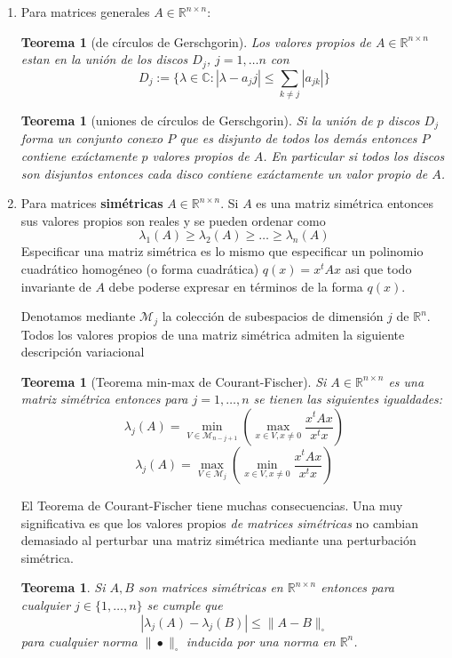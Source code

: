 \documentclass[12pt]{amsart}
\newtheorem{theorem}[lemma]{Teorema}
\theoremstyle{definition}
\renewcommand{\geq}{\geqslant}
\renewcommand{\leq}{\leqslant}
\newcommand{\CC}{\ensuremath{\mathbb{C}}}
\newcommand{\RR}{\ensuremath{\mathbb{R}}}
\begin{document}
\begin{enumerate}
{\begin{enumerate}
\item Para matrices generales $A\in \RR^{n\times n}$:
\begin{theorem} [de círculos de Gerschgorin] Los valores propios de $A\in \RR^{n\times n}$ estan en la unión de los discos $D_j$, $j=1,\dots n$ con
\[D_j:=\{\lambda\in \CC: |\lambda-a_jj|\leq \sum_{k\neq j} |a_{jk}|\}\]
\end{theorem}

\begin{theorem} [uniones de círculos de Gerschgorin] Si la unión de $p$ discos $D_j$ forma un conjunto conexo $P$ que es disjunto de todos los demás entonces $P$ contiene exáctamente $p$ valores propios de $A$. En particular si todos los discos son disjuntos entonces cada disco contiene exáctamente un valor propio de $A$.
\end{theorem}

\item Para matrices {\bf simétricas} $A\in \RR^{n\times n}$. Si $A$ es una matriz simétrica entonces sus valores propios son reales y se pueden ordenar como 
\[\lambda_1(A)\geq \lambda_2(A)\geq \dots \geq \lambda_n(A)\] 
Especificar una matriz simétrica es lo mismo que especificar un polinomio cuadrático homogéneo (o forma cuadrática) $q(x)=x^tAx$ asi que todo invariante de $A$ debe poderse expresar en términos de la forma $q(x)$.

Denotamos mediante $\mathcal{M}_j$ la colección de subespacios de dimensión $j$ de $\RR^n$. Todos los valores propios de una matriz simétrica admiten la siguiente descripción variacional

\begin{theorem}[Teorema min-max de Courant-Fischer] Si $A\in \RR^{n\times n}$ es una matriz simétrica entonces para $j=1,\dots, n$ se tienen las siguientes igualdades:
\[\lambda_j(A) = \min_{V\in \mathcal{M}_{n-j+1}}\left(\max_{x\in V,x\neq 0} \frac{x^tAx}{x^tx}\right)\]
\[\lambda_j(A) = \max_{V\in \mathcal{M}_{j}}\left(\min_{x\in V,x\neq 0} \frac{x^tAx}{x^tx}\right)\]
\end{theorem}

El Teorema de Courant-Fischer tiene muchas consecuencias. Una muy significativa es que los valores propios \emph{de matrices simétricas} no cambian demasiado al perturbar una matriz simétrica mediante una perturbación simétrica.

\begin{theorem} Si $A,B$ son matrices simétricas en $\RR^{n\times n}$ entonces para cualquier $j\in \{1,\dots, n\}$ se cumple que 
\[\left|\lambda_j(A)-\lambda_j(B)\right|\leq \|A-B\|_{\square}\]
para cualquier norma $\|\bullet\|_{\square}$ inducida por una norma en $\RR^n$.
\end{theorem}


\end{enumerate}}
\end{enumerate}
\end{document}
